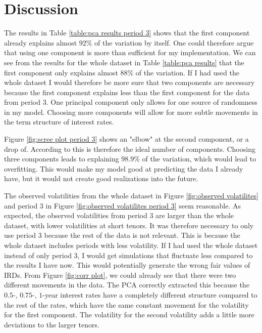 
\section{Discussion}

\noindent The results in Table \ref{table:pca results period 3} shows that the first component already explains almost $92\%$ of the variation by itself. One could therefore argue that using one component is more than sufficient for my implementation. We can see from the results for the whole dataset in Table \ref{table:pca results} that the first component only explains almost $88\%$ of the variation. If I had used the whole dataset I would therefore be more sure that two components are necessary because the first component explains less than the first component for the data from period 3. One principal component only allows for one source of randomness in my model. Choosing more components will allow for more subtle movements in the term structure of interest rates.

Figure \ref{fig:scree plot period 3} shows an "elbow" at the second component, or a drop of. According to \cite[p.~409]{intro_stat_learning} this is therefore the ideal number of components. Choosing three components leads to explaining $98.9\%$ of the variation, which would lead to overfitting. This would make my model good at predicting the data I already have, but it would not create good realizations into the future.

The observed volatilities from the whole dataset in Figure \ref{fig:observed volatilites} and period $3$ in Figure \ref{fig:observed volatilites period 3} seem reasonable. As expected, the observed volatilities from period $3$ are larger than the whole dataset, with lower volatilities at short tenors. It was therefore necessary to only use period $3$ because the rest of the data is not relevant. This is because the whole dataset includes periods with less volatility. If I had used the whole dataset instead of only period 3, I would get simulations that fluctuate less compared to the results I have now. This would potentially generate the wrong fair values of IRDs. From Figure \ref{fig:corr plot}, we could already see that there were two different movements in the data. The PCA correctly extracted this \newpage \noindent because the $0.5$-, $0.75$-, $1$-year interest rates have a completely different structure compared to the rest of the rates, which have the same constant movement for the volatility for the first component. The volatility for the second volatility adds a little more deviations to the larger tenors.

